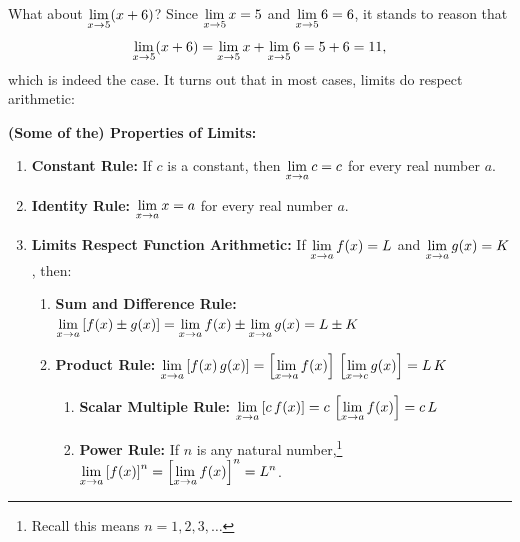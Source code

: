 \medskip

What about $\displaystyle{\lim_{x \rightarrow 5}  (x+6)}$?  Since $\displaystyle{\lim_{x \rightarrow 5} x = 5}$ and $\displaystyle{ \lim_{x \rightarrow 5} 6 = 6}$, it stands to reason that \[\displaystyle{\lim_{x \rightarrow 5}  (x+6) = \lim_{x \rightarrow 5} x  + \lim_{x \rightarrow 5} 6 = 5 + 6 = 11,}\] which is indeed the case.  It turns out that in most cases, limits do respect arithmetic:
\medskip

\colorbox{ResultColor}{\bbm

\begin{thm}  \label{LimitProp01}  \textbf{(Some of the) Properties of Limits:}

\begin{enumerate}

\item  \textbf{Constant Rule:} If $c$ is a constant, then $\displaystyle{ \lim_{x \rightarrow a} c = c}$ for every real number $a$.

\item \textbf{Identity Rule:} $\displaystyle{ \lim_{x \rightarrow a} x = a}$ for every real number $a$.

\item  \textbf{Limits Respect Function Arithmetic:}  If $\displaystyle{ \lim_{x \rightarrow a} f(x) = L}$ and $\displaystyle{ \lim_{x \rightarrow a} g(x) = K}$, then:

\begin{enumerate}

\item \textbf{Sum and Difference Rule:}  $\displaystyle{\lim_{x \rightarrow a} \left[f(x)\pm g(x)\right] =
\lim_{x \rightarrow a} f(x) \pm \lim_{x \rightarrow a} g(x) = L
\pm K}$

\item \textbf{Product Rule:}  $\displaystyle{\lim_{x \rightarrow a} \left[f(x) \, g(x)\right] =
\left[\lim_{x \rightarrow a} f(x)\right] \, \left[ \lim_{x
\rightarrow c} g(x)\right] = L \, K}$

\begin{enumerate}

\item \textbf{Scalar Multiple Rule:}  $\displaystyle{\lim_{x \rightarrow a} \left[c \, f(x)\right] =
c \, \left[\lim_{x \rightarrow a} f(x)\right] =c \, L}$


\item \textbf{Power Rule:}  If   $n$ is any
natural number,\footnote{Recall this means  $n = 1,2,3,\ldots$}
$\displaystyle{\lim_{x \rightarrow a} \left[f(x)\right]^{n} = \left[
\lim_{x \rightarrow a} f(x) \right]^{n}= L^{n}}$.
\end{enumerate}


\end{enumerate}
\end{enumerate}
\end{thm}}
